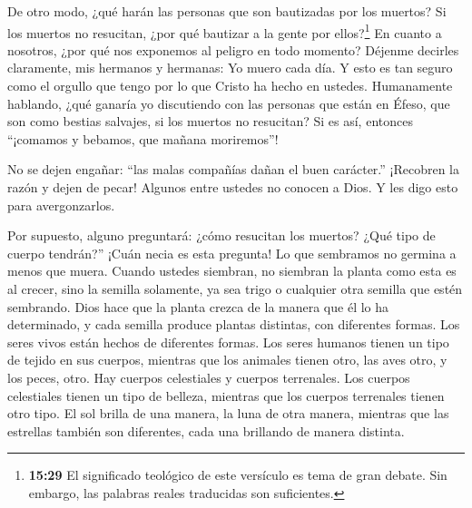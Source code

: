  De otro modo, ¿qué harán las personas que son bautizadas
por los muertos? Si los muertos no resucitan, ¿por qué bautizar a la
gente por ellos?\footnote{\textbf{15:29} El significado teológico de
  este versículo es tema de gran debate. Sin embargo, las palabras
  reales traducidas son suficientes.}  En cuanto a
nosotros, ¿por qué nos exponemos al peligro en todo momento?
 Déjenme decirles claramente, mis hermanos y hermanas: Yo
muero cada día. Y esto es tan seguro como el orgullo que tengo por lo
que Cristo ha hecho en ustedes.  Humanamente hablando, ¿qué
ganaría yo discutiendo con las personas que están en Éfeso, que son como
bestias salvajes, si los muertos no resucitan? Si es así, entonces
``¡comamos y bebamos, que mañana moriremos''!

 No se dejen engañar: ``las malas compañías dañan el buen
carácter.''  ¡Recobren la razón y dejen de pecar! Algunos
entre ustedes no conocen a Dios. Y les digo esto para avergonzarlos.

 Por supuesto, alguno preguntará: ¿cómo resucitan los
muertos? ¿Qué tipo de cuerpo tendrán?''  ¡Cuán necia es
esta pregunta! Lo que sembramos no germina a menos que muera.
 Cuando ustedes siembran, no siembran la planta como esta
es al crecer, sino la semilla solamente, ya sea trigo o cualquier otra
semilla que estén sembrando.  Dios hace que la planta
crezca de la manera que él lo ha determinado, y cada semilla produce
plantas distintas, con diferentes formas.  Los seres vivos
están hechos de diferentes formas. Los seres humanos tienen un tipo de
tejido en sus cuerpos, mientras que los animales tienen otro, las aves
otro, y los peces, otro.  Hay cuerpos celestiales y cuerpos
terrenales. Los cuerpos celestiales tienen un tipo de belleza, mientras
que los cuerpos terrenales tienen otro tipo.  El sol brilla
de una manera, la luna de otra manera, mientras que las estrellas
también son diferentes, cada una brillando de manera distinta.

